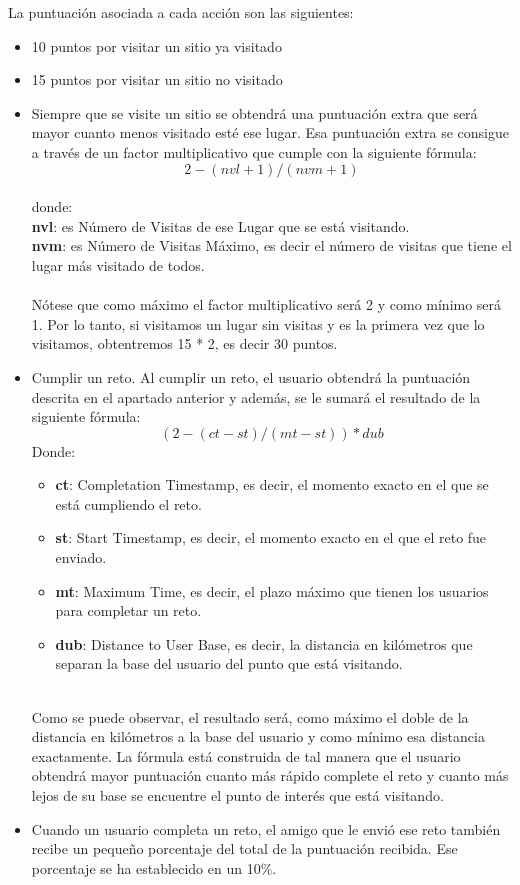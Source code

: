 \documentclass{report}
\begin{document}
La puntuación asociada a cada acción son las siguientes:\\
\begin{itemize}
\item 10 puntos por visitar un sitio ya visitado
\item 15 puntos por visitar un sitio no visitado
\item Siempre que se visite un sitio se obtendrá una puntuación extra que será mayor cuanto menos visitado esté ese lugar. Esa puntuación extra se consigue a través de un factor multiplicativo que cumple con la siguiente fórmula:\\
\[2 - (nvl+1)/(nvm + 1)\]\\donde:\\
\textbf{nvl}: es Número de Visitas de ese Lugar que se está visitando.\\ 
\textbf{nvm}: es Número de Visitas Máximo, es decir el número de visitas que tiene el lugar más visitado de todos.\\
\\
Nótese que como máximo el factor multiplicativo será 2 y como mínimo será 1. Por lo tanto, si visitamos un lugar sin visitas y es la primera vez que lo visitamos, obtentremos 15 * 2, es decir 30 puntos.
\item Cumplir un reto. Al cumplir un reto, el usuario obtendrá la puntuación descrita en el apartado anterior y además, se le sumará el resultado de la siguiente fórmula:\\
\[(2 - (ct-st)/(mt-st))*dub\]
Donde:\\
\begin{itemize}
    \item \textbf{ct}: Completation Timestamp, es decir, el momento exacto en el que se está cumpliendo el reto.\\
    \item \textbf{st}: Start Timestamp, es decir, el momento exacto en el que el reto fue enviado.\\
    \item \textbf{mt}: Maximum Time, es decir, el plazo máximo que tienen los usuarios para completar un reto.\\
    \item \textbf{dub}: Distance to User Base, es decir, la distancia en kilómetros que separan la base del usuario del punto que está visitando.\\

\end{itemize}
\\
Como se puede observar, el resultado será, como máximo el doble de la distancia en kilómetros a la base del usuario y como mínimo esa distancia exactamente. La fórmula está construida de tal manera que el usuario obtendrá mayor puntuación cuanto más rápido complete el reto y cuanto más lejos de su base se encuentre el punto de interés que está visitando.\\

\item Cuando un usuario completa un reto, el amigo que le envió ese reto también recibe un pequeño porcentaje del total de la puntuación recibida. Ese porcentaje se ha establecido en un 10\%. 
\end{itemize}
\end{document}

